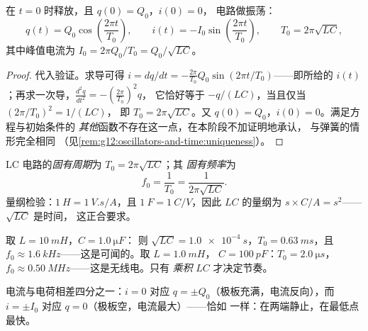 \begin{theorem}[LC 电路的自由振荡]\label{thm:g12:rlc-oscillations:oscillation}
在 $t = 0$ 时释放，且 $q(0) = Q_0$，$i(0) = 0$，
电路做振荡：
\[
q(t) = Q_0 \cos\!\left(\frac{2\pi t}{T_0}\right),
\qquad
i(t) = -I_0 \sin\!\left(\frac{2\pi t}{T_0}\right),
\qquad
T_0 = 2\pi\sqrt{LC},
\]
其中峰值电流为 $I_0 = 2\pi Q_0/T_0 = Q_0/\sqrt{LC}$。
\end{theorem}

\begin{proof}
代入验证。求导可得
$i = dq/dt = -\frac{2\pi}{T_0} Q_0 \sin(2\pi t/T_0)$——即所给的
$i(t)$；再求一次导，$\frac{d^2q}{dt^2} = -(\frac{2\pi}{T_0})^2 q$，
它恰好等于 $-q/(LC)$，当且仅当 $(2\pi/T_0)^2 = 1/(LC)$，
即 $T_0 = 2\pi\sqrt{LC}$。又 $q(0) = Q_0$，$i(0) = 0$。满足方程与初始条件的
\emph{其他}函数不存在这一点，在本阶段不加证明地承认，
与弹簧的情形完全相同
（见\cref{rem:g12:oscillators-and-time:uniqueness}）。
\end{proof}

\begin{definition}[固有周期与频率]\label{def:g12:rlc-oscillations:period}
LC 电路的\emph{固有周期}为
$T_0 = 2\pi\sqrt{LC}$；其
\emph{固有频率}为
\[
f_0 = \frac{1}{T_0} = \frac{1}{2\pi\sqrt{LC}} .
\]
量纲检验：$\qty{1}{H} = \qty{1}{V.s/A}$，且
$\qty{1}{F} = \qty{1}{C/V}$，因此 $LC$ 的量纲为
$\unit{s} \times \unit{C/A} = \unit{s^2}$——$\sqrt{LC}$ 是时间，
这正合要求。
\end{definition}

\begin{example}[几个数值]\label{ex:g12:rlc-oscillations:firstnumbers}
取 $L = \qty{10}{mH}$，$C = \qty{1.0}{\micro F}$：
则 $\sqrt{LC} = \qty{1.0e-4}{s}$，$T_0 = \qty{0.63}{ms}$，且
$f_0 \approx \qty{1.6}{kHz}$——这是可闻的。取 $L = \qty{1.0}{mH}$，
$C = \qty{100}{pF}$：$T_0 = \qty{2.0}{\micro s}$，
$f_0 \approx \qty{0.50}{MHz}$——这是无线电。只有
\emph{乘积} $LC$ 才决定节奏。
\end{example}

\begin{remark}[相差四分之一周期]\label{rem:g12:rlc-oscillations:quarter}
电流与电荷相差四分之一：$i = 0$
对应 $q = \pm Q_0$（极板充满，电流反向），而 $i = \pm I_0$
对应 $q = 0$（极板空，电流最大）——恰如
一样：在两端静止，在最低点最快。
\end{remark}

